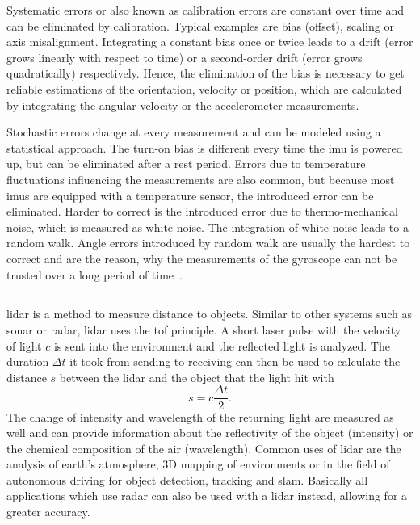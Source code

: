 Systematic errors or also known as calibration errors are constant over time and can be eliminated by calibration.
Typical examples are bias (offset), scaling or axis misalignment.
Integrating a constant bias once or twice leads to a drift (error grows linearly with respect to time) or a second-order drift (error grows quadratically) respectively.
Hence, the elimination of the bias is necessary to get reliable estimations of the orientation, velocity or position, which are calculated by integrating the angular velocity or the accelerometer measurements.

Stochastic errors change at every measurement and can be modeled using a statistical approach.
The turn-on bias is different every time the \gls{imu} is powered up, but can be eliminated after a rest period.
Errors due to temperature fluctuations influencing the measurements are also common, but because most \glspl{imu} are equipped with a temperature sensor, the introduced error can be eliminated.
Harder to correct is the introduced error due to thermo-mechanical noise, which is measured as white noise.
The integration of white noise leads to a random walk.
Angle errors introduced by random walk are usually the hardest to correct and are the reason, why the measurements of the gyroscope can not be trusted over a long period of time~\cite{Woodman2007}.


\subsection{}
\label{ssec:lidar}
\gls{lidar} is a method to measure distance to objects.
Similar to other systems such as \gls{sonar} or \gls{radar}, \gls{lidar} uses the \gls{tof} principle.
A short laser pulse with the velocity of light $c$ is sent into the environment and the reflected light is analyzed.
The duration $\Delta t$ it took from sending to receiving can then be used to calculate the distance $s$ between the \gls{lidar} and the object that the light hit with
\begin{equation}
    s = c\frac{\Delta t}{2}.
\end{equation}
The change of intensity and wavelength of the returning light are measured as well and can provide information about the reflectivity of the object (intensity) or the chemical composition of the air (wavelength).
Common uses of \gls{lidar} are the analysis of earth's atmosphere, 3D mapping of environments or in the field of autonomous driving for object detection, tracking and \gls{slam}.
Basically all applications which use \gls{radar} can also be used with a \gls{lidar} instead, allowing for a greater accuracy.

